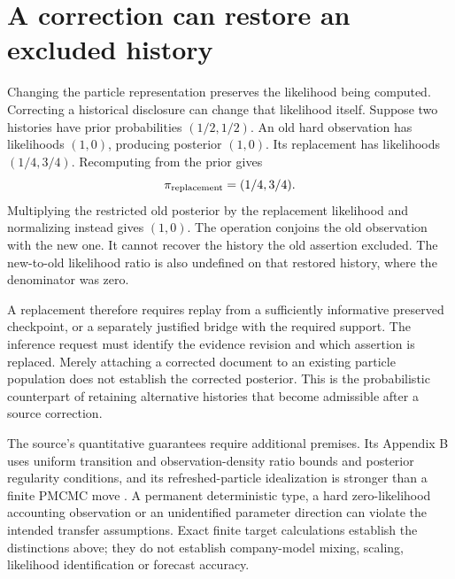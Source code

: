 \section{A correction can restore an excluded history}
Changing the particle representation preserves the likelihood being computed.
Correcting a historical disclosure can change that likelihood itself. Suppose
two histories have prior probabilities $(1/2,1/2)$. An old hard observation
has likelihoods $(1,0)$, producing posterior $(1,0)$. Its replacement has
likelihoods $(1/4,3/4)$. Recomputing from the prior gives
\begin{equation}
 \pi_{\rm replacement}=(1/4,3/4).
\end{equation}
Multiplying the restricted old posterior by the replacement likelihood and
normalizing instead gives $(1,0)$. The operation conjoins the old observation
with the new one. It cannot recover the history the old assertion excluded.
The new-to-old likelihood ratio is also undefined on that restored history,
where the denominator was zero.

A replacement therefore requires replay from a sufficiently informative
preserved checkpoint, or a separately justified bridge with the required
support. The inference request must identify the evidence revision and which
assertion is replaced. Merely attaching a corrected document to an existing
particle population does not establish the corrected posterior. This is the
probabilistic counterpart of retaining alternative histories that become
admissible after a source correction.

The source's quantitative guarantees require additional premises. Its
Appendix B uses uniform transition and observation-density ratio bounds and
posterior regularity conditions, and its refreshed-particle idealization is
stronger than a finite PMCMC move
\citep[Proposition 2 and Appendix B]{litclosesmc2}. A permanent deterministic
type, a hard zero-likelihood accounting observation or an unidentified
parameter direction can violate the intended transfer assumptions. Exact
finite target calculations establish the distinctions above; they do not
establish company-model mixing, scaling, likelihood identification or
forecast accuracy.
